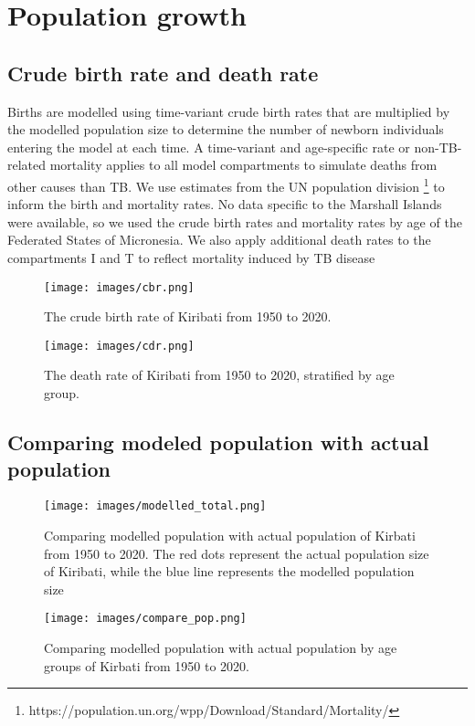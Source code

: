 

\section{Population growth}
\subsection{Crude birth rate and death rate}
Births are modelled using time-variant crude birth rates that are multiplied by the modelled population 
size to determine the number of newborn individuals entering the model at each time. A time-variant 
and age-specific rate or non-TB-related mortality applies to all model compartments to simulate 
deaths from other causes than TB. We use estimates from the UN population division \footnote{https://population.un.org/wpp/Download/Standard/Mortality/}  to inform the 
birth and mortality rates. No data specific to the Marshall Islands were available, so we used the crude 
birth rates and mortality rates by age of the Federated States of Micronesia.
We also apply additional death rates to the compartments I and T to reflect mortality induced by TB 
disease
\begin{figure}[!htb]
    \texttt{[image: images/cbr.png]}
    \caption{The crude birth rate of Kiribati from 1950 to 2020.}
    \label{fig:cbr}
\end{figure}

\begin{figure}[!htb]
    \texttt{[image: images/cdr.png]}
    \caption{The death rate of Kiribati from 1950 to 2020, stratified by age group.}
    \label{fig:cdr}
\end{figure}

\subsection{Comparing modeled population with actual population}
\begin{figure}[!htb]
    \texttt{[image: images/modelled\_total.png]}
    \caption{Comparing modelled population with actual population of Kirbati from 1950 to 2020. The red dots represent the actual population size of Kiribati,
     while the blue line represents the modelled population size}
    \label{fig:modelled_total}
\end{figure}

\begin{figure}[!htb]
    \texttt{[image: images/compare\_pop.png]}
    \caption{Comparing modelled population with actual population by age groups of Kirbati from 1950 to 2020.}
    \label{fig:compare_group}
\end{figure}